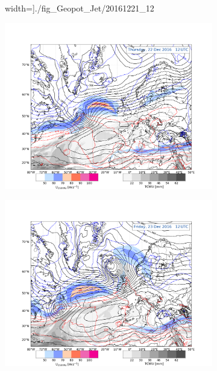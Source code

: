 \begin{figure}[h!]
\begin{subfigure}[b]{0.49\textwidth}
        width=\textwidth]{./fig_Geopot_Jet/20161221_12}
        \caption{}\label{fig:GP21}
    \end{subfigure}
	\begin{subfigure}[b]{0.49\textwidth}
		\includegraphics[trim={4.2cm 3.9cm 4.3cm 5.1cm},clip,
	width=\textwidth]{./fig_Geopot_Jet/20161222_12}
		\caption{}\label{fig:GP22}
	\end{subfigure}
	\begin{subfigure}[b]{0.49\textwidth}
		\includegraphics[trim={4.2cm 3.9cm 4.3cm 5.1cm},clip,
	width=\textwidth]{./fig_Geopot_Jet/20161223_12}

\end{subfigure}
\end{figure}
